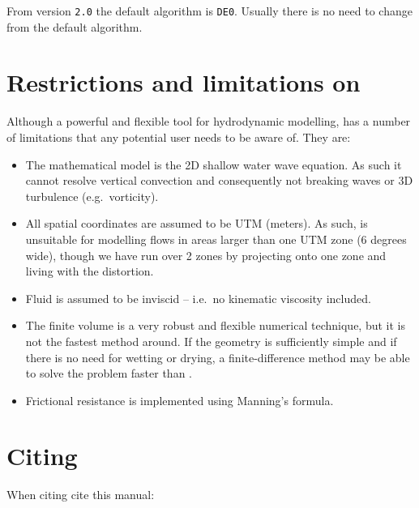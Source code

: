 \documentclass{manual}
\begin{document}
From version \verb|2.0| the default algorithm is \verb|DE0|. Usually there is no need to change from the default algorithm. 
 


\section{Restrictions and limitations on \anuga}
\label{ch:limitations}

Although a powerful and flexible tool for hydrodynamic modelling, \anuga has a
number of limitations that any potential user needs to be aware of. They are:

\begin{itemize}
  \item The mathematical model is the 2D shallow water wave equation.
  As such it cannot resolve vertical convection and consequently not breaking
  waves or 3D turbulence (e.g.\ vorticity).
  \item All spatial coordinates are assumed to be UTM (meters). As such,
  \anuga is unsuitable for modelling flows in areas larger than one UTM zone
  (6 degrees wide), though we have run over 2 zones by projecting onto one zone and 
  living with the distortion.
  \item Fluid is assumed to be inviscid -- i.e.\ no kinematic viscosity included.
  \item The finite volume is a very robust and flexible numerical technique,
  but it is not the fastest method around. If the geometry is sufficiently
  simple and if there is no need for wetting or drying, a finite-difference
  method may be able to solve the problem faster than \anuga.
  \item Frictional resistance is implemented using Manning's formula.
\end{itemize}

\pagebreak
\section{Citing \anuga}

When citing \anuga cite this manual:
\end{document}
